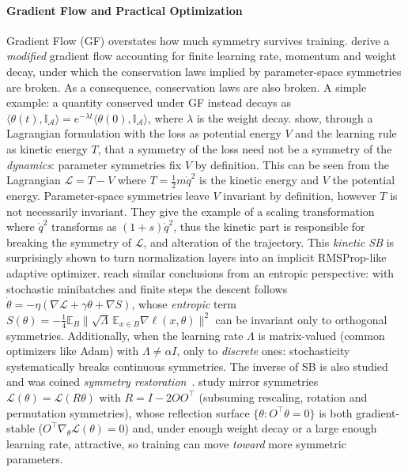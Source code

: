 \documentclass[mathematics,review,submit,moreauthors]{Definitions/mdpi}
\begin{document}
\paragraph{Gradient Flow and Practical Optimization}
Gradient Flow (GF) overstates how much symmetry survives training.
\citet{kunin2020} derive a \emph{modified} gradient flow accounting for finite learning rate, momentum and weight decay, under which the conservation laws implied by parameter-space symmetries are broken.
As a consequence, conservation laws are also broken.
A simple example: a quantity conserved under GF instead decays as $\langle\theta(t),\mathbb{I}_{\mathcal{A}}\rangle=e^{-\lambda t}\langle\theta(0),\mathbb{I}_{\mathcal{A}}\rangle$, where $\lambda$ is the weight decay.
\citet{tanaka2021} show, through a Lagrangian formulation with the loss as potential energy $V$ and the learning rule as kinetic energy $T$, that a symmetry of the loss need not be a symmetry of the \emph{dynamics}: parameter symmetries fix $V$ by definition.
This can be seen from the Lagrangian $\mathcal{L}=T-V$ where $T=\frac{1}{2} m \dot q^2$ is the kinetic energy and $V$ the potential energy. Parameter-space symmetries leave $V$ invariant by definition, however $T$ is not necessarily invariant.
They give the example of a scaling transformation where $\dot q^2$ transforms as $(1+s)\dot q^2$, thus the kinetic part is responsible for breaking the symmetry of $\mathcal{L}$, and alteration of the trajectory.
This \emph{kinetic SB} is surprisingly shown to turn normalization layers into an implicit RMSProp-like adaptive optimizer.
\citet{ziyin2025a} reach similar conclusions from an entropic perspective: with stochastic minibatches and finite steps the descent follows $\dot\theta=-\eta(\nabla \mathcal{L}+\gamma\theta+\nabla S)$, whose \emph{entropic} term $S(\theta)=-\tfrac14\mathbb{E}_B\|\sqrt{\Lambda}\,\mathbb{E}_{x\in B}\nabla \ell(x,\theta)\|^2$ can be invariant only to orthogonal symmetries.
Additionally, when the learning rate $\Lambda$ is matrix-valued (common optimizers like Adam) with $\Lambda\neq\alpha I$, only to \emph{discrete} ones: stochasticity systematically breaks continuous symmetries.
The inverse of SB is also studied and was coined \emph{symmetry restoration}~\citep{ziyin2025}.
\citet{ziyin2024} study mirror symmetries $\mathcal{L}(\theta)=\mathcal{L}(R\theta)$ with $R=I-2OO^\top$ (subsuming rescaling, rotation and permutation symmetries), whose reflection surface $\{\theta:O^\top \theta=0\}$ is both gradient-stable ($O^\top\nabla_\theta \mathcal{L}(\theta)=0$) and, under enough weight decay or a large enough learning rate, attractive, so training can move \emph{toward} more symmetric parameters.
\end{document}
